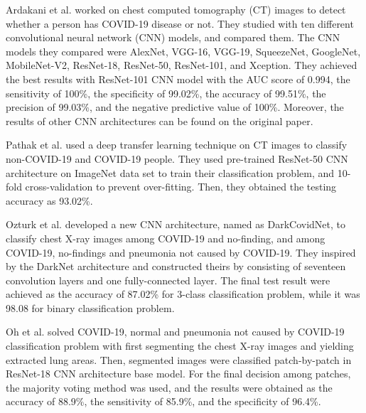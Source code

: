 
Ardakani et al. \cite{literature_ARDAKANI} worked on chest computed tomography (CT) images to detect whether a person has COVID-19 disease or not. They studied with ten different convolutional neural network (CNN) models, and compared them. The CNN models they compared were AlexNet, VGG-16, VGG-19, SqueezeNet, GoogleNet, MobileNet-V2, ResNet-18, ResNet-50, ResNet-101, and Xception. They achieved the best results with ResNet-101 CNN model with the AUC score of 0.994, the sensitivity of 100\%, the specificity of 99.02\%, the accuracy of 99.51\%, the precision of 99.03\%, and the negative predictive value of 100\%. Moreover, the results of other CNN architectures can be found on the original paper.

Pathak et al. \cite{literature_Pathak} used a deep transfer learning technique on CT images to classify non-COVID-19 and COVID-19 people. They used pre-trained ResNet-50 CNN architecture on ImageNet \cite{imagenet} data set to train their classification problem, and 10-fold cross-validation to prevent over-fitting. Then, they obtained the testing accuracy as 93.02\%.

Ozturk et al. \cite{literature_OZTURK} developed a new CNN architecture, named as DarkCovidNet, to classify chest X-ray images among COVID-19 and no-finding, and among COVID-19, no-findings and pneumonia not caused by COVID-19. They inspired by the DarkNet architecture \cite{yolo_darknet} and constructed theirs by consisting of seventeen convolution layers and one fully-connected layer. The final test result were achieved as the accuracy of 87.02\% for 3-class classification problem, while it was 98.08 for binary classification problem.

Oh et al. \cite{literature_oh} solved COVID-19, normal and pneumonia not caused by COVID-19 classification problem with first segmenting the chest X-ray images and yielding extracted lung areas. Then, segmented images were classified patch-by-patch in ResNet-18 CNN architecture base model. For the final decision among patches, the majority voting method was used, and the results were obtained as the accuracy of 88.9\%, the sensitivity of 85.9\%, and the specificity of 96.4\%.

